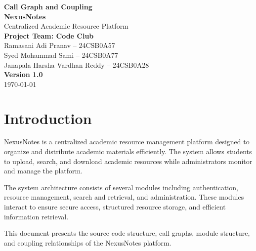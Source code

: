 \documentclass[12pt,a4paper]{report}
\begin{document}

\begin{titlepage}
    \centering
    \vspace*{2cm}
    
    {\Huge \textbf{Call Graph and Coupling}}\\[0.5cm]
    {\Large \textbf{NexusNotes}}\\[0.5cm]
    {\large Centralized Academic Resource Platform}\\[2cm]
    
    \textbf{Project Team: Code Club}\\[0.5cm]
    Ramasani Adi Pranav -- 24CSB0A57\\
    Syed Mohammad Sami -- 24CSB0A77\\
    Janapala Harsha Vardhan Reddy -- 24CSB0A28\\[2cm]
    
    \vfill
    {\large \textbf{Version 1.0}}\\
    {\large \today}
    
\end{titlepage}

\tableofcontents
\newpage


\chapter{Introduction}

NexusNotes is a centralized academic resource management platform designed to organize and distribute academic materials efficiently. The system allows students to upload, search, and download academic resources while administrators monitor and manage the platform. 

The system architecture consists of several modules including authentication, resource management, search and retrieval, and administration. These modules interact to ensure secure access, structured resource storage, and efficient information retrieval.

This document presents the source code structure, call graphs, module structure, and coupling relationships of the NexusNotes platform.

\end{document}
